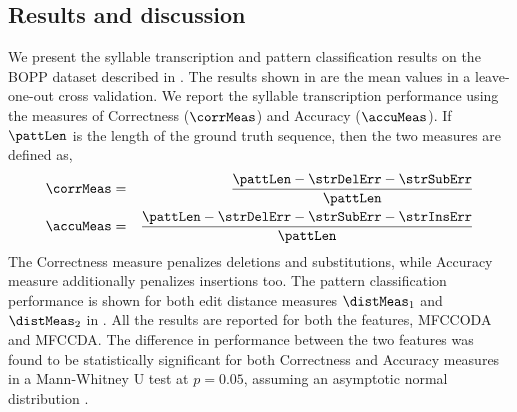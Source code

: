 \subsection{Results and discussion}\label{sec:boperc:results}
We present the syllable transcription and pattern classification results on the \acrshort{BOPP} dataset described in . The results shown in  are the mean values in a leave-one-out cross validation. We report the syllable transcription performance using the measures of Correctness ($\corrMeas$) and Accuracy ($\accuMeas$). If $\pattLen$ is the length of the ground truth sequence, then the two measures are defined as,  
\begin{eqnarray}\label{eqn:pp:straccu}
\corrMeas & = & \frac{\pattLen - \strDelErr - \strSubErr}{\pattLen} \\
\accuMeas & = & \frac{\pattLen - \strDelErr - \strSubErr - \strInsErr}{\pattLen}
\end{eqnarray}
The Correctness measure penalizes deletions and substitutions, while Accuracy measure additionally penalizes insertions too. The pattern classification performance is shown for both edit distance measures $\distMeas_1$ and $\distMeas_2$ in . All the results are reported for both the features, \acrshort{MFCCODA} and \acrshort{MFCCDA}. The difference in performance between the two features was found to be statistically significant for both Correctness and Accuracy measures in a Mann-Whitney U test at $p = 0.05$, assuming an asymptotic normal distribution \cite{mann:47:Utest}.

